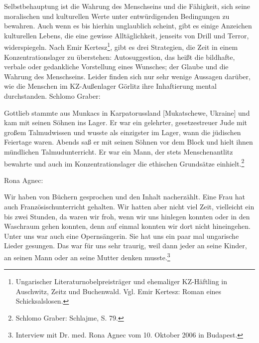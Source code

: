 \documentclass[a4paper,12pt,ngerman,
]{nisebook}
\begin{document}
Selbstbehauptung ist die Wahrung des Menschseins und die Fähigkeit, sich seine moralischen und kulturellen Werte unter entwürdigenden Bedingungen zu bewahren. Auch wenn es bis hierhin unglaublich scheint, gibt es einige Anzeichen kulturellen Lebens, die eine gewisse Alltäglichkeit, jenseits von Drill und Terror, widerspiegeln. Nach Emir Kertesz\footnote{Ungarischer Literaturnobelpreisträger und ehemaliger KZ-Häftling in Auschwitz, Zeitz und Buchenwald. Vgl. Emir Kertesz: Roman eines Schicksalslosen.}, gibt es drei Strategien, die Zeit in einem Konzentrationslager zu überstehen: Autosuggestion, das heißt die bildhafte, verbale oder gedankliche Vorstellung eines Wunsches; der Glaube und die Wahrung des Menschseins.
Leider finden sich nur sehr wenige Aussagen darüber, wie die Menschen im KZ-Außenlager Görlitz ihre Inhaftierung mental durchstanden.\newline
Schlomo Graber:
\begin{leftbar}
Gottlieb stammte aus Munkacs in Karpatorussland  [Mukatschewe, Ukraine] und kam mit seinen Söhnen ins Lager. Er war ein gelehrter, gesetzestreuer Jude mit großem Talmudwissen und wusste als einzigster im Lager, wann die jüdischen Feiertage waren. Abends saß er mit seinen Söhnen vor dem Block und hielt ihnen mündlichen Talmudunterricht. Er war ein Mann, der stets Menschenantlitz bewahrte und auch im Konzentrationslager die ethischen Grundsätze einhielt.\footnote{Schlomo Graber: Schlajme, S. 79.}
\end{leftbar}

Rona Agnec:
\begin{leftbar}
Wir haben von Büchern gesprochen und den Inhalt nacherzählt. Eine Frau hat auch Französischunterricht gehalten. Wir hatten aber nicht viel Zeit, vielleicht ein bis zwei Stunden, da waren wir froh, wenn wir uns hinlegen konnten oder in den Waschraum gehen konnten, denn auf einmal konnten wir dort nicht hineingehen. Unter uns war auch eine Opernsängerin. Sie hat uns ein paar mal ungarische Lieder gesungen. Das war für uns sehr traurig, weil dann jeder an seine Kinder, an seinen Mann oder an seine Mutter denken musste.\footnote{Interview mit Dr. med. Rona Agnec vom 10. Oktober 2006 in Budapest.}
\end{leftbar}
\end{document}
